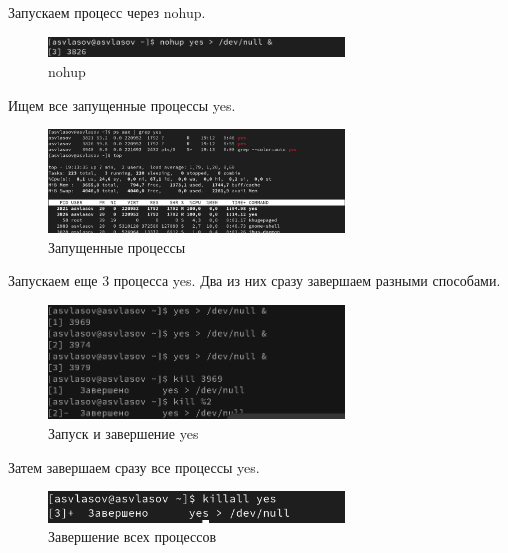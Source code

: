 \documentclass[
  12pt,
  a4paper,
  DIV=11,
  numbers=noendperiod]{scrreprt}
\begin{document}
Запускаем процесс через nohup.

\begin{figure}

{\centering \includegraphics[width=0.7\textwidth,height=\textheight]{image/12.png}

}

\caption{nohup}

\end{figure}%

Ищем все запущенные процессы yes.

\begin{figure}

{\centering \includegraphics[width=0.7\textwidth,height=\textheight]{image/13.png}

}

\caption{Запущенные процессы}

\end{figure}%

Запускаем еще 3 процесса yes. Два из них сразу завершаем разными
способами.

\begin{figure}

{\centering \includegraphics[width=0.7\textwidth,height=\textheight]{image/14.png}

}

\caption{Запуск и завершение yes}

\end{figure}%

Затем завершаем сразу все процессы yes.

\begin{figure}

{\centering \includegraphics[width=0.7\textwidth,height=\textheight]{image/15.png}

}

\caption{Завершение всех процессов}

\end{figure}%
\end{document}

